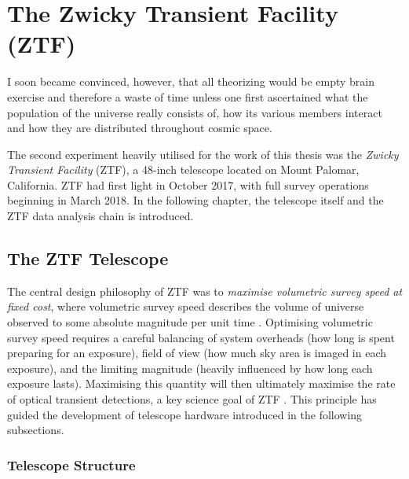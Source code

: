\setchapterpreamble[u]{\margintoc}
\chapter{The Zwicky Transient Facility (ZTF)}
\begin{fquote}I soon became convinced, however, that all theorizing would be empty brain exercise and therefore a waste of time unless one first ascertained what the population of the universe really consists of, how its various members interact and how they are distributed throughout cosmic space.
\end{fquote}

The second experiment heavily utilised for the work of this thesis was the \emph{Zwicky Transient Facility} (ZTF), a 48-inch telescope located on Mount Palomar, California. ZTF had first light in October 2017, with full survey operations beginning in March 2018. In the following chapter, the telescope itself and the ZTF data analysis chain is introduced.

\section{The ZTF Telescope}

The central design philosophy of ZTF was to \emph{maximise volumetric survey speed at fixed cost}, where volumetric survey speed describes the volume of universe observed to some absolute magnitude per unit time . Optimising volumetric survey speed requires a careful balancing of system overheads (how long is spent preparing for an exposure), field of view (how much sky area is imaged in each exposure), and the limiting magnitude (heavily influenced by how long each exposure lasts). Maximising this quantity will then ultimately maximise the rate of optical transient detections, a key science goal of ZTF . This principle has guided the development of telescope hardware introduced in the following subsections.

\subsection*{Telescope Structure}

